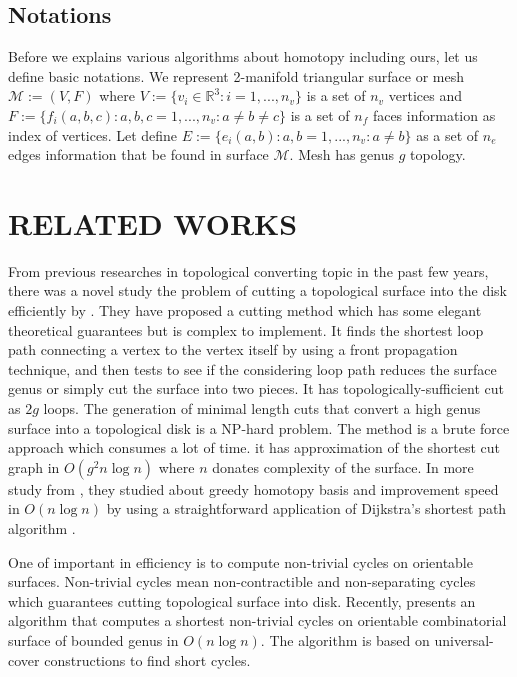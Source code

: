 \documentclass[a4paper,twoside]{article}
\begin{document}
\subsection{Notations}
Before we explains various algorithms about homotopy including ours, let us define basic notations. We represent 2-manifold triangular surface or mesh $\mathscr{M}:=(V,F)$ where $V:=\{ v_{i}\in \mathbb{R}^3 : i = 1, ... , n_v\}$ is a set of $n_v$ vertices and $F:=\{ f_{i}(a,b,c) : a,b,c = 1, ... , n_v : a \neq b \neq c\}$ is a set of $n_f$ faces information as index of vertices. Let define $E:=\{ e_{i}(a,b) : a,b = 1, ... , n_v : a \neq b\}$ as a set of $n_e$ edges information that be found in surface $\mathscr{M}$. Mesh has genus $g$ topology. 


\section{\uppercase{Related Works}}
\label{sec:related works}
\noindent From previous researches in topological converting topic in the past few years, there was a novel study the problem of cutting a topological surface into the disk efficiently by \cite{Erickson:2002:OCS:513400.513430}. They have proposed a cutting method which has some elegant theoretical guarantees but is complex to implement. It finds the shortest loop path connecting a vertex to the vertex itself by using a front propagation technique, and then tests to see if the considering loop path reduces the surface genus or simply cut the surface into two pieces. It has topologically-sufficient cut as $2g$ loops. The generation of minimal length cuts that convert a high genus surface into a topological disk is a NP-hard problem. The method is a brute force approach which consumes a lot of time. it has approximation of the shortest cut graph in $O(g^2 n \log n)$ where $n$ donates complexity of the surface. In more study from \cite{Erickson:2005:GOH:1070432.1070581}, they studied about greedy homotopy basis and improvement speed in $O(n \log n)$
by using a straightforward application of Dijkstra's shortest path algorithm \cite{Dijkstra59anote}. 

One of important in efficiency is to compute non-trivial cycles on orientable surfaces. Non-trivial cycles mean non-contractible and non-separating cycles which guarantees cutting topological surface into disk. Recently, \cite{Kutz:2006:CSN:1137856.1137919} presents an algorithm that computes a shortest non-trivial cycles on orientable combinatorial surface of bounded genus in  $O(n \log n)$. The algorithm is based on universal-cover constructions to find short cycles.
\end{document}
